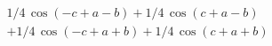 \begin{multline*}
1/4\,\cos \left( -c+a-b \right) +1/4\,\cos \left( c+a-b \right) \\
+1/4\, \cos \left( -c+a+b \right) +1/4\,\cos \left( c+a+b \right)
\end{multline*}
